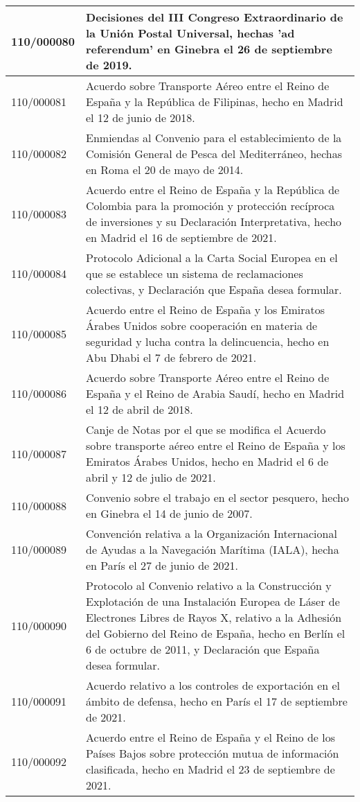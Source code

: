 {\begin{table}[H]
\begin{center}
\begin{tabularx}{\linewidth}{| l | X |}
\hline
110/000080 & Decisiones del III Congreso Extraordinario de la Unión Postal Universal, hechas 'ad referendum' en Ginebra el 26 de septiembre de 2019. \\
\hline
110/000081 & Acuerdo sobre Transporte Aéreo entre el Reino de España y la República de Filipinas, hecho en Madrid el 12 de junio de 2018. \\
\hline
110/000082 & Enmiendas al Convenio para el establecimiento de la Comisión General de Pesca del Mediterráneo, hechas en Roma el 20 de mayo de 2014. \\
\hline
110/000083 & Acuerdo entre el Reino de España y la República de Colombia para la promoción y protección recíproca de inversiones y su Declaración Interpretativa, hecho en Madrid el 16 de septiembre de 2021. \\
\hline
110/000084 & Protocolo Adicional a la Carta Social Europea en el que se establece un sistema de reclamaciones colectivas, y Declaración que España desea formular. \\
\hline
110/000085 & Acuerdo entre el Reino de España y los Emiratos Árabes Unidos sobre cooperación en materia de seguridad y lucha contra la delincuencia, hecho en Abu Dhabi el 7 de febrero de 2021. \\
\hline
110/000086 & Acuerdo sobre Transporte Aéreo entre el Reino de España y el Reino de Arabia Saudí, hecho en Madrid el 12 de abril de 2018. \\
\hline
110/000087 & Canje de Notas por el que se modifica el Acuerdo sobre transporte aéreo entre el Reino de España y los Emiratos Árabes Unidos, hecho en Madrid el 6 de abril y 12 de julio de 2021. \\
\hline
110/000088 & Convenio sobre el trabajo en el sector pesquero, hecho en Ginebra el 14 de junio de 2007. \\
\hline
110/000089 & Convención relativa a la Organización Internacional de Ayudas a la Navegación Marítima (IALA), hecha en París el 27 de junio de 2021. \\
\hline
110/000090 & Protocolo al Convenio relativo a la Construcción y Explotación de una Instalación Europea de Láser de Electrones Libres de Rayos X, relativo a la Adhesión del Gobierno del Reino de España, hecho en Berlín el 6 de octubre de 2011, y Declaración que España desea formular. \\
\hline
110/000091 & Acuerdo relativo a los controles de exportación en el ámbito de defensa, hecho en París el 17 de septiembre de 2021. \\
\hline
110/000092 & Acuerdo entre el Reino de España y el Reino de los Países Bajos sobre protección mutua de información clasificada, hecho en Madrid el 23 de septiembre de 2021. \\

\end{tabularx}
\end{center}
\end{table}}
